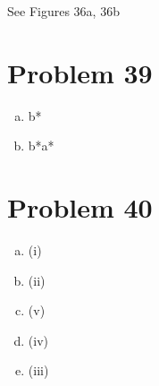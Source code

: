 \documentclass[11pt]{article}
\begin{document}
See Figures 36a, 36b

\section*{Problem 39}

\begin{enumerate}[(a)]
	\item b*
	\item b*a*
	
\end{enumerate}

\section*{Problem 40}

\begin{enumerate}[(a)]
	\item (i)
	\item (ii)
	\item (v)
	\item (iv)
	\item (iii)
	
\end{enumerate}
\end{document}
